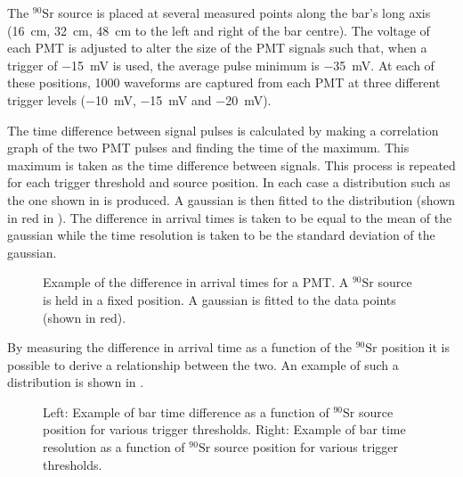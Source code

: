 The $^{90}\text{Sr}$ source is placed at several measured points along the bar's long axis (\SI{16}{\cm}, \SI{32}{\cm}, \SI{48}{\cm} to the left and right of the bar centre).
The voltage of each PMT is adjusted to alter the size of the PMT signals such that, when a trigger of \SI{-15}{\milli\volt} is used, the average pulse minimum is \SI{-35}{\milli\volt}.
At each of these positions, 1000 waveforms are captured from each PMT at three different trigger levels (\SI{-10}{\milli\volt}, \SI{-15}{\milli\volt} and \SI{-20}{\milli\volt}).

The time difference between signal pulses is calculated by making a correlation graph of the two PMT pulses and finding the time of the maximum.
This maximum is taken as the time difference between signals.
This process is repeated for each trigger threshold and source position.
In each case a distribution such as the one shown in  is produced.
A gaussian is then fitted to the distribution (shown in red in ).
The difference in arrival times is taken to be equal to the mean of the gaussian while the time resolution is taken to be the standard deviation of the gaussian.

\begin{figure}[h]
  \begin{adjustbox}{max totalsize={.8\textwidth}, center}
    
  \end{adjustbox}
  \caption[Example of difference in signal arrival times for a PMT.]{Example of the difference in arrival times for a PMT. A $^{90}\text{Sr}$ source is held in a fixed position. A gaussian is fitted to the data points (shown in red).}
  \label{fig:deltaTEx}
\end{figure}

By measuring the difference in arrival time as a function of the $^{90}\text{Sr}$ position it is possible to derive a relationship between the two.
An example of such a distribution is shown in .

\begin{figure}[h]
  \begin{minipage}[t]{.5\textwidth}
    \begin{adjustbox}{max totalsize={\textwidth}, center}
      
    \end{adjustbox}
  \end{minipage}
  \hfill
  \begin{minipage}[t]{.5\textwidth}
    \begin{adjustbox}{max totalsize={\textwidth}, center}
      
    \end{adjustbox}
  \end{minipage}
  \caption[Examples of bar time difference and time resolution as a function of source position.]{Left: Example of bar time difference as a function of $^{90}\text{Sr}$ source position for various trigger thresholds. Right: Example of bar time resolution as a function of $^{90}\text{Sr}$ source position for various trigger thresholds. }
  \label{fig:barTimeDiffRes}
\end{figure}

